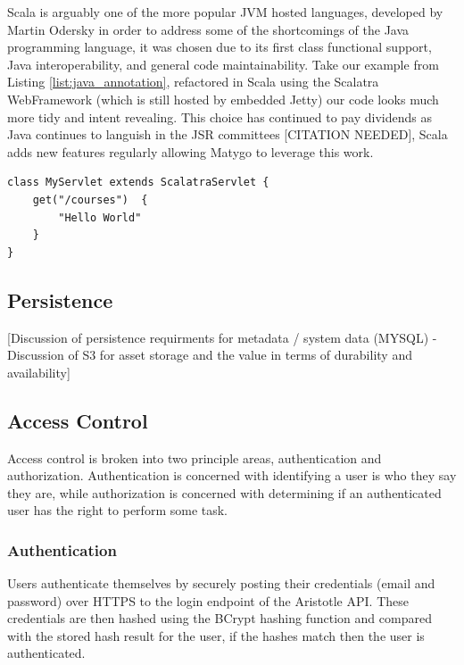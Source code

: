 \documentclass[a4paper,12pt,titlepage]{report}
\begin{document}
Scala is arguably one of the more popular JVM hosted languages, developed by Martin Odersky in order to address some of the shortcomings of the Java programming language, it was chosen due to its first class functional support, Java interoperability, and general code maintainability. 
Take our example from Listing \ref{list:java_annotation}, refactored in Scala using the Scalatra WebFramework (which is still hosted by embedded Jetty) our code looks much more tidy and intent revealing. 
This choice has continued to pay dividends as Java continues to languish in the JSR committees [CITATION NEEDED], Scala adds new features regularly allowing Matygo to leverage this work.

\begin{lstlisting}[caption=Scalatra Handler, label=list:scalara_handler]
class MyServlet extends ScalatraServlet {
	get("/courses")	 {
		"Hello World"	
	}
}
\end{lstlisting}




\subsection{Persistence} %
\label{sub:persistence}


[Discussion of persistence requirments for metadata / system data (MYSQL) - Discussion of S3 for asset storage and the value in terms of durability and availability]


\subsection{Access Control} %
\label{sub:access_control}

Access control is broken into two principle areas, authentication and authorization. 
Authentication is concerned with identifying a user is who they say they are, while authorization is concerned with determining if an authenticated user has the right to perform some task.

\subsubsection{Authentication} %
\label{sub:access_control:authentication}

Users authenticate themselves by securely posting their credentials (email and password) over HTTPS to the login endpoint of the Aristotle API. These credentials are then hashed using the BCrypt hashing function and compared with the stored hash result for the user, if the hashes match then the user is authenticated. 
\end{document}
